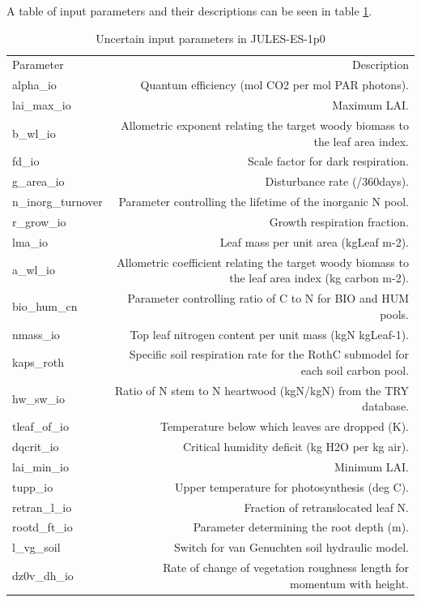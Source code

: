 \documentclass[gmd, manuscript]{copernicus}
\begin{document}
A table of input parameters and their descriptions can be seen in table \ref{table:Parameters}.
\begin{table}[t]
\caption{Uncertain input parameters in JULES-ES-1p0}
\label{table:Parameters}
\begin{tabular}{l r}
\tophline
Parameter & Description  \\ 
\middlehline

alpha\_io & Quantum efficiency (mol CO2 per mol PAR photons). \\ 
  lai\_max\_io & Maximum LAI. \\ 
  b\_wl\_io & Allometric exponent relating the target woody biomass to the leaf area index.\\ 
  fd\_io & Scale factor for dark respiration.\\ 
  g\_area\_io &  Disturbance rate (/360days).\\ 
  n\_inorg\_turnover &Parameter controlling the lifetime of the inorganic N pool. \\ 
  r\_grow\_io & Growth respiration fraction.\\ 
  lma\_io & Leaf mass per unit area (kgLeaf m-2). \\ 
  a\_wl\_io & Allometric coefficient relating the target woody biomass to the leaf area index (kg carbon m-2). \\ 
  bio\_hum\_cn &  Parameter controlling ratio of C to N for BIO and HUM pools.\\ 
  nmass\_io &  Top leaf nitrogen content per unit mass (kgN kgLeaf-1).\\ 
  kaps\_roth &  Specific soil respiration rate for the RothC submodel for each soil carbon pool.\\ 
  hw\_sw\_io & Ratio of N stem to N heartwood (kgN/kgN) from the TRY database. \\ 
  tleaf\_of\_io & Temperature below which leaves are dropped (K).\\ 
  dqcrit\_io & Critical humidity deficit (kg H2O per kg air). \\ 
  lai\_min\_io & Minimum LAI. \\ 
  tupp\_io & Upper temperature for photosynthesis (deg C). \\ 
  retran\_l\_io & Fraction of retranslocated leaf N.\\ 
  rootd\_ft\_io & Parameter determining the root depth (m). \\ 
  l\_vg\_soil & Switch for van Genuchten soil hydraulic model. \\ 
  dz0v\_dh\_io & Rate of change of vegetation roughness length for momentum with height. \\ 

\end{tabular}
\end{table}
\end{document}
